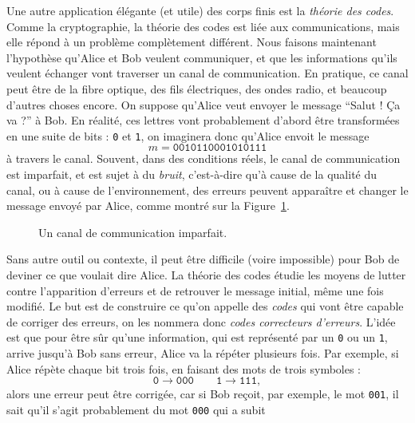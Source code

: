 Une autre application élégante (et utile) des corps finis est la \emph{théorie
des codes}. Comme la cryptographie, la théorie des codes est liée aux
communications, mais elle répond à un problème complètement différent. Nous
faisons maintenant l'hypothèse qu'Alice et Bob veulent communiquer, et que les
informations qu'ils veulent échanger vont traverser un canal de communication.
En pratique, ce canal peut être de la fibre optique, des fils électriques, des
ondes radio, et beaucoup d'autres choses encore. On suppose qu'Alice veut
envoyer le message ``Salut ! Ça va ?'' à Bob. En réalité, ces lettres vont
probablement d'abord être transformées en une suite de bits : \texttt{0} et
\texttt{1}, on imaginera donc qu'Alice envoit le message
\[
  m = \texttt{0010110001010111}
\]
à travers le canal. Souvent, dans des conditions réels, le canal de
communication est imparfait, et est sujet à du \emph{bruit}, c'est-à-dire qu'à
cause de la qualité du canal, ou à cause de l'environnement, des erreurs peuvent
apparaître et changer le message envoyé par Alice, comme montré sur la
Figure~\ref{fig:communication-channel}.
\begin{figure}[h]
  \centering
  \caption{Un canal de communication imparfait.}
  \label{fig:communication-channel}
\end{figure}
Sans autre outil ou contexte, il peut être difficile (voire impossible) pour Bob
de deviner ce que voulait dire Alice. La théorie des codes étudie les moyens de
lutter contre l'apparition d'erreurs et de retrouver le message initial, même
une fois modifié. Le but est de construire ce qu'on appelle des \emph{codes} qui
vont être capable de corriger des erreurs, on les nommera donc \emph{codes
correcteurs d'erreurs}. L'idée est que pour être sûr qu'une information, qui est
représenté par un \texttt{0} ou un \texttt{1}, arrive jusqu'à Bob sans erreur,
Alice va la répéter plusieurs fois. Par exemple, si Alice répète chaque bit
trois fois, en faisant des mots de trois symboles :
\[
  \texttt{0}\to\texttt{000}\quad\quad\texttt{1}\to\texttt{111},
\]
alors une erreur peut être corrigée, car si Bob reçoit, par exemple, le mot
\texttt{001}, il sait qu'il s'agit probablement du mot \texttt{000} qui a subit
